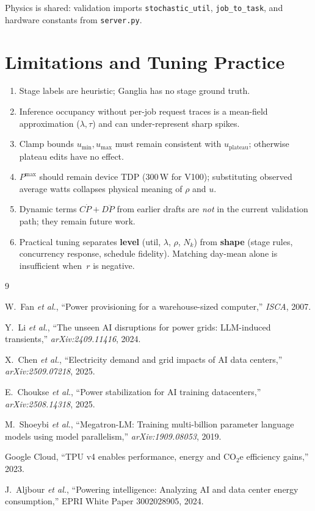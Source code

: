 \documentclass[10pt,a4paper,twocolumn]{article}
\begin{document}
Physics is shared: validation imports \texttt{stochastic\_util},
\texttt{job\_to\_task}, and hardware constants from \texttt{server.py}.

\section{Limitations and Tuning Practice}

\begin{enumerate}[leftmargin=1.2em,itemsep=2pt,topsep=2pt]
  \item Stage labels are heuristic; Ganglia has no stage ground truth.
  \item Inference occupancy without per-job request traces is a mean-field
        approximation ($\lambda,\tau$) and can under-represent sharp spikes.
  \item Clamp bounds $u_{\min},u_{\max}$ must remain consistent with
        $u_{\mathrm{plateau}}$; otherwise plateau edits have no effect.
  \item $P^{\max}$ should remain device TDP (300\,W for V100); substituting
        observed average watts collapses physical meaning of $\rho$ and $u$.
  \item Dynamic terms $C\dot P+D\ddot P$ from earlier drafts are
        \emph{not} in the current validation path; they remain future work.
  \item Practical tuning separates \textbf{level} (util, $\lambda$, $\rho$,
        $N_k$) from \textbf{shape} (stage rules, concurrency response,
        schedule fidelity). Matching day-mean alone is insufficient when~$r$
        is negative.
\end{enumerate}

\balance
\begin{thebibliography}{9}

W.~Fan \textit{et al.},
``Power provisioning for a warehouse-sized computer,''
\textit{ISCA}, 2007.

Y.~Li \textit{et al.},
``The unseen AI disruptions for power grids: LLM-induced transients,''
\textit{arXiv:2409.11416}, 2024.

X.~Chen \textit{et al.},
``Electricity demand and grid impacts of AI data centers,''
\textit{arXiv:2509.07218}, 2025.

E.~Choukse \textit{et al.},
``Power stabilization for AI training datacenters,''
\textit{arXiv:2508.14318}, 2025.

M.~Shoeybi \textit{et al.},
``Megatron-LM: Training multi-billion parameter language models using
model parallelism,''
\textit{arXiv:1909.08053}, 2019.

Google Cloud, ``TPU v4 enables performance, energy and CO$_2$e efficiency gains,''
2023.

J.~Aljbour \textit{et al.},
``Powering intelligence: Analyzing AI and data center energy consumption,''
EPRI White Paper 3002028905, 2024.

\end{thebibliography}
\end{document}
